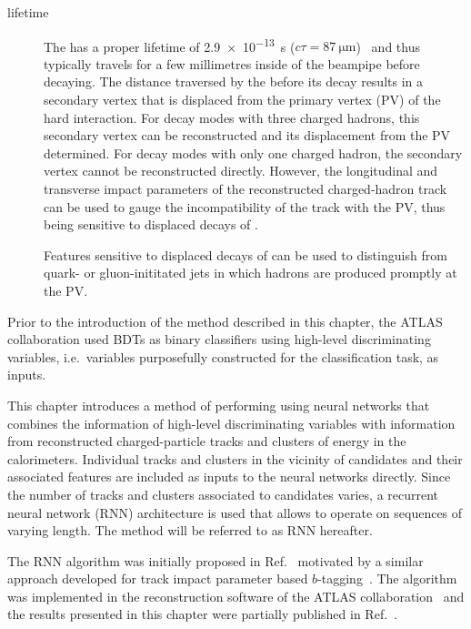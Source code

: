 \begin{description}
\item[\taulepton lifetime] The \taulepton has a proper lifetime of
  \SI{2.9e-13}{\second}
  ($c \tau = \SI{87}{\micro\metre}$)~\cite{pdg2020} and thus typically
  travels for a few millimetres inside of the beampipe before
  decaying. The distance traversed by the \taulepton before its decay
  results in a secondary vertex that is displaced from the primary
  vertex (PV) of the hard interaction. For \taulepton decay modes with
  three charged hadrons, this secondary vertex can be reconstructed
  and its displacement from the PV determined. For decay modes with
  only one charged hadron, the secondary vertex cannot be
  reconstructed directly. However, the longitudinal and transverse
  impact parameters of the reconstructed charged-hadron track can be
  used to gauge the incompatibility of the track with the PV, thus
  being sensitive to displaced decays of \tauleptons.

  Features sensitive to displaced decays of \tauleptons can be used to
  distinguish \tauhad from quark- or gluon-inititated jets in which
  hadrons are produced promptly at the PV.

\end{description}
Prior to the introduction of the method described in this chapter, the
ATLAS collaboration used BDTs as binary classifiers using high-level
discriminating variables, i.e.\ variables purposefully constructed for
the classification task, as inputs.

This chapter introduces a method of performing \tauid using neural
networks that combines the information of high-level discriminating
variables with information from reconstructed charged-particle tracks
and clusters of energy in the calorimeters. Individual tracks and
clusters in the vicinity of \tauhadvis candidates and their associated
features are included as inputs to the neural networks directly. Since
the number of tracks and clusters associated to \tauhadvis candidates
varies, a recurrent neural network (RNN) architecture is used that
allows to operate on sequences of varying length. The method will be
referred to as RNN \tauid hereafter.

The RNN \tauid algorithm was initially proposed in
Ref.~\cite{cdeutsch-master} motivated by a similar approach developed
for track impact parameter based
$b$-tagging~\cite{ATL-PHYS-PUB-2017-003}. The algorithm was
implemented in the reconstruction software of the ATLAS
collaboration~\cite{ATL-SOFT-PUB-2021-001} and the results presented
in this chapter were partially published in
Ref.~\cite{ATL-PHYS-PUB-2019-033}. %

